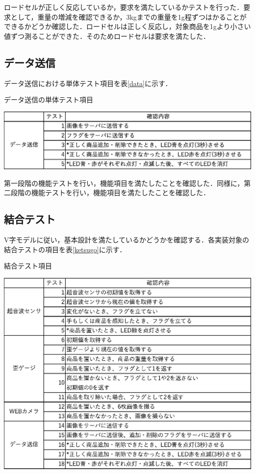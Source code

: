 ロードセルが正しく反応しているか，要求を満たしているかテストを行った．要求として，重量の増減を確認できるか，3kgまでの重量を1g程ずつはかることができるかどうか確認した．ロードセルは正しく反応し，対象商品を1gより小さい値ずつ測ることができた．そのためロードセルは要求を満たした．


\subsection*{データ送信}

データ送信における単体テスト項目を表\ref{data}に示す．

\begin{table}[htbp]
\centering
\caption{データ送信の単体テスト項目}
\includegraphics[width = 15cm]{./picture/data.eps}
\label{data}
\end{table}

第一段階の機能テストを行い，機能項目を満たしたことを確認した．同様に，第二段階の機能テストを行い，機能項目を満たしたことを確認した．


\subsection{結合テスト}

V字モデルに従い，基本設計を満たしているかどうかを確認する．各実装対象の結合テストの項目を表\ref{ketsugo}に示す．


\begin{table}[htbp]
\centering
\caption{結合テスト項目}
\includegraphics[width = 15cm]{./picture/ketsugo.eps}
\label{ketsugo}
\end{table}

